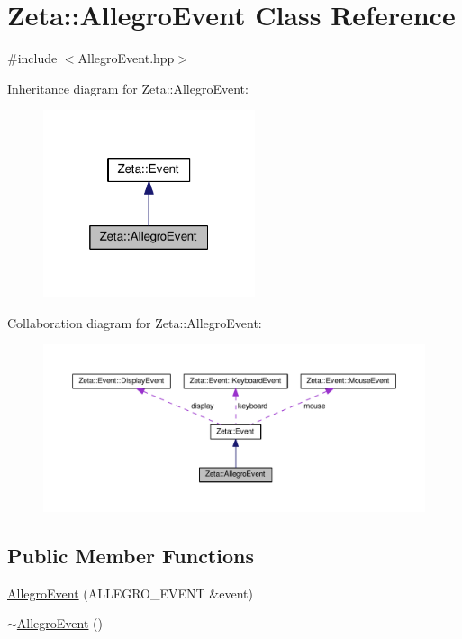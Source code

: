 \hypertarget{classZeta_1_1AllegroEvent}{\section{Zeta\+:\+:Allegro\+Event Class Reference}
\label{classZeta_1_1AllegroEvent}
}


{\ttfamily \#include $<$Allegro\+Event.\+hpp$>$}



Inheritance diagram for Zeta\+:\+:Allegro\+Event\+:\nopagebreak
\begin{figure}[H]
\begin{center}
\leavevmode
\includegraphics[width=176pt]{classZeta_1_1AllegroEvent__inherit__graph}
\end{center}
\end{figure}


Collaboration diagram for Zeta\+:\+:Allegro\+Event\+:\nopagebreak
\begin{figure}[H]
\begin{center}
\leavevmode
\includegraphics[width=350pt]{classZeta_1_1AllegroEvent__coll__graph}
\end{center}
\end{figure}
\subsection*{Public Member Functions}
\begin{DoxyCompactItemize}
\item 
\hyperlink{classZeta_1_1AllegroEvent_aaaebaa75a7bdda5762265631212defc8}{Allegro\+Event} (A\+L\+L\+E\+G\+R\+O\+\_\+\+E\+V\+E\+N\+T \&event)
\item 
\hyperlink{classZeta_1_1AllegroEvent_ae328ab540d2f31a80a13a6268849e485}{$\sim$\+Allegro\+Event} ()
\end{DoxyCompactItemize}
